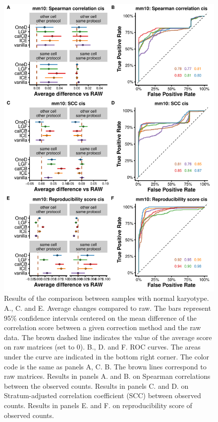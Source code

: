 \documentclass[12pt]{report}
\begin{document}
\begin{figure}
\centerline{\includegraphics[width=.75\textwidth]{img/correlation_normal_other_metrics.pdf}}
\caption{Results of the comparison between samples with normal karyotype. A., C.
    and E.  Average changes compared to raw. The bars
represent 95\% confidence intervals centered on the mean difference of the
correlation score between a given correction method and the raw data. The
brown dashed line indicates the value of the average score on raw matrices
(set to 0). B., D. and F. ROC curves. The areas under
the curve are indicated in the bottom right corner. The color code is the
same as panels A, C. B. The brown lines correspond to raw matrices. Results in
panels A. and B. on Spearman correlations between the observed counts. Results in
panels C. and D. on Stratum-adjusted correlation coefficient (SCC) between observed counts. Results in
panels E. and F. on reproducibility score of observed counts.}
\end{figure}
\end{document}
